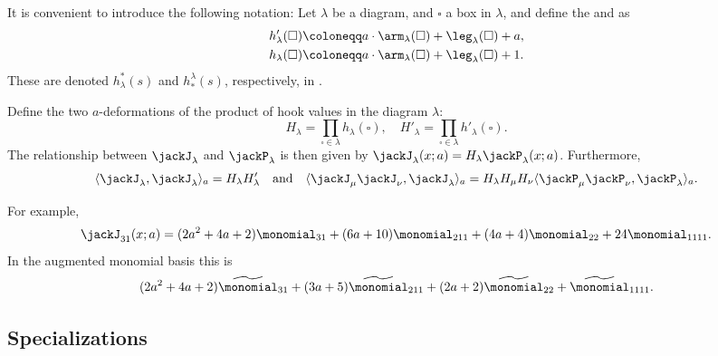 It is convenient to introduce the following notation:
Let $\lambda$ be a diagram, and $\square$ a box in $\lambda$, and define the
\label{upperHookLength} and
\label{lowerHookLength} as
\begin{align}
h'_\lambda(\square)
&\coloneqq
a \cdot \arm_\lambda(\square) + \leg_\lambda(\square) + a, \\
h_\lambda(\square)
&\coloneqq
a \cdot \arm_\lambda(\square) + \leg_\lambda(\square) + 1.
\end{align}
These are denoted $h^*_\lambda(s)$ and $h_*^\lambda(s)$, respectively, in
\cite{Stanley1989}.

Define the two $a$-deformations of the product of hook values in the diagram
$\lambda$:
\[
H_\lambda = \prod_{\square \in \lambda} h_\lambda(\square), \quad
H'_\lambda = \prod_{\square \in \lambda} h'_\lambda(\square).
\]
The relationship between $\jackJ_\lambda$ and $\jackP_\lambda$ is
then given by $\jackJ_\lambda(x;a) = H_\lambda \jackP_\lambda(x;a)$.
Furthermore,
\[
\langle \jackJ_\lambda, \jackJ_\lambda \rangle_a = H_\lambda H'_\lambda
\quad
\text{and}
\quad
\langle \jackJ_\mu \jackJ_\nu, \jackJ_\lambda \rangle_a
=
H_\lambda H_\mu H_\nu
\langle \jackP_\mu \jackP_\nu, \jackP_\lambda \rangle_a .
\]



%
%
%


\begin{example}
For example,
\[
\jackJ_{31}(x;a) =
(2a^2 + 4a + 2)\monomial_{31}
+(6a + 10)\monomial_{211}
+(4a + 4)\monomial_{22}
+ 24\monomial_{1111}.
\]
In the augmented monomial basis this is
\[
(2a^2 + 4a + 2)\widetilde{\monomial}_{31}
+(3a + 5)\widetilde{\monomial}_{211}
+(2a + 2)\widetilde{\monomial}_{22}
+\widetilde{\monomial}_{1111}.
\]
\end{example}



\subsection[jackSpecializations]{Specializations}

